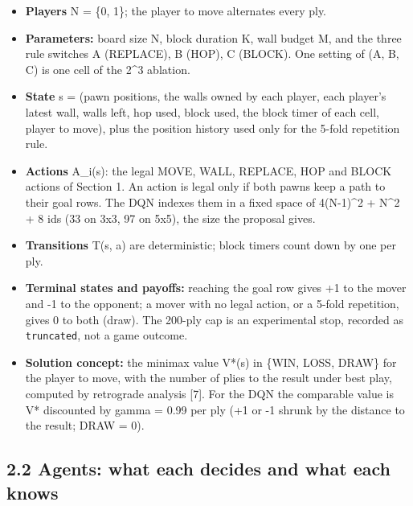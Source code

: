 \documentclass[11pt]{article}
\begin{document}
\begin{itemize}
\item \textbf{Players} N = \{0, 1\}; the player to move alternates every ply.
\item \textbf{Parameters:} board size N, block duration K, wall budget M, and the three rule switches
A (REPLACE), B (HOP), C (BLOCK). One setting of (A, B, C) is one cell of the 2\textasciicircum{}3 ablation.
\item \textbf{State} s = (pawn positions, the walls owned by each player, each player's latest wall,
walls left, hop used, block used, the block timer of each cell, player to move), plus the
position history used only for the 5-fold repetition rule.
\item \textbf{Actions} A\_i(s): the legal MOVE, WALL, REPLACE, HOP and BLOCK actions of Section 1. An
action is legal only if both pawns keep a path to their goal rows. The DQN indexes them in a
fixed space of 4(N-1)\textasciicircum{}2 + N\textasciicircum{}2 + 8 ids (33 on 3x3, 97 on 5x5), the size the proposal gives.
\item \textbf{Transitions} T(s, a) are deterministic; block timers count down by one per ply.
\item \textbf{Terminal states and payoffs:} reaching the goal row gives +1 to the mover and -1 to the
opponent; a mover with no legal action, or a 5-fold repetition, gives 0 to both (draw). The
200-ply cap is an experimental stop, recorded as \texttt{truncated}, not a game outcome.
\item \textbf{Solution concept:} the minimax value V*(s) in \{WIN, LOSS, DRAW\} for the player to move,
with the number of plies to the result under best play, computed by retrograde analysis [7].
For the DQN the comparable value is V* discounted by gamma = 0.99 per ply (+1 or -1 shrunk by
the distance to the result; DRAW = 0).
\end{itemize}

\subsection{2.2 Agents: what each decides and what each knows}
\end{document}
